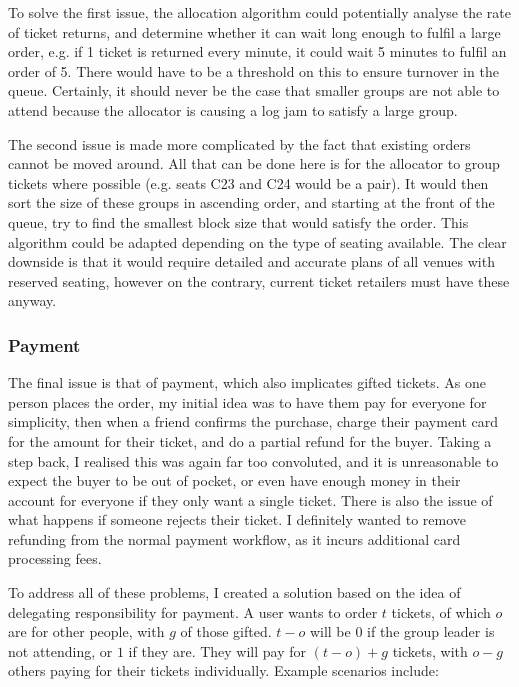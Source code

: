 \documentclass[12pt,a4paper]{bhamdissertation}
\begin{document}
To solve the first issue, the allocation algorithm could potentially analyse the rate of ticket returns, and determine whether it can wait long enough to fulfil a large order, e.g. if 1 ticket is returned every minute, it could wait 5 minutes to fulfil an order of 5. There would have to be a threshold on this to ensure turnover in the queue. Certainly, it should never be the case that smaller groups are not able to attend because the allocator is causing a log jam to satisfy a large group.

The second issue is made more complicated by the fact that existing orders cannot be moved around. All that can be done here is for the allocator to group tickets where possible (e.g. seats C23 and C24 would be a pair). It would then sort the size of these groups in ascending order, and starting at the front of the queue, try to find the smallest block size that would satisfy the order. This algorithm could be adapted depending on the type of seating available. The clear downside is that it would require detailed and accurate plans of all venues with reserved seating, however on the contrary, current ticket retailers must have these anyway.

\subsubsection{Payment}

The final issue is that of payment, which also implicates gifted tickets. As one person places the order, my initial idea was to have them pay for everyone for simplicity, then when a friend confirms the purchase, charge their payment card for the amount for their ticket, and do a partial refund for the buyer. Taking a step back, I realised this was again far too convoluted, and it is unreasonable to expect the buyer to be out of pocket, or even have enough money in their account for everyone if they only want a single ticket. There is also the issue of what happens if someone rejects their ticket. I definitely wanted to remove refunding from the normal payment workflow, as it incurs additional card processing fees.

To address all of these problems, I created a solution based on the idea of delegating responsibility for payment. A user wants to order $t$ tickets, of which $o$ are for other people, with $g$ of those gifted. $t - o$ will be $0$ if the group leader is not attending, or $1$ if they are. They will pay for $(t - o) + g$ tickets, with $o - g$ others paying for their tickets individually. Example scenarios include:
\end{document}
